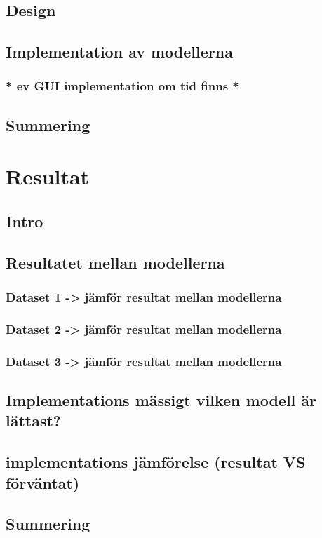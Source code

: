 \documentclass{kaumasters} %
\begin{document}
\section{Design}
\section{Implementation av modellerna}
\subsection{* ev GUI implementation om tid finns *}
\section{Summering}


\newpage

\chapter{Resultat}
\section{Intro}
\section{Resultatet mellan modellerna}
\subsection{Dataset 1 -> jämför resultat mellan modellerna}
\subsection{Dataset 2 -> jämför resultat mellan modellerna}
\subsection{Dataset 3 -> jämför resultat mellan modellerna}
\section{Implementations mässigt vilken modell är lättast?}
\section{implementations jämförelse (resultat VS förväntat)}
\section{Summering}
\end{document}
